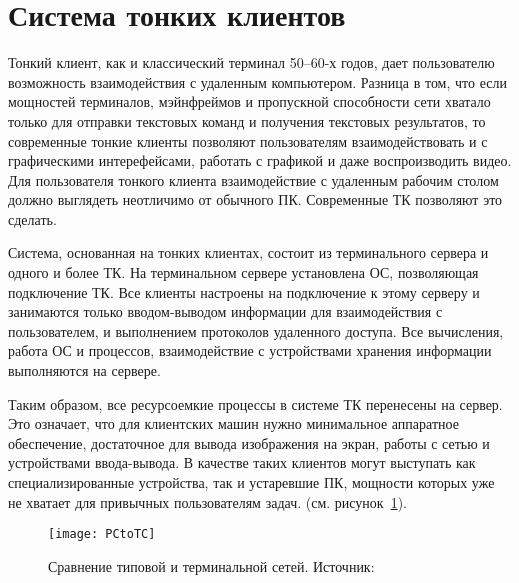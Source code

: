 \section{Система тонких клиентов}
Тонкий клиент, как и классический терминал 50–60-х годов, дает пользователю возможность
взаимодействия с удаленным компьютером. Разница в том, что если мощностей терминалов,
мэйнфреймов и пропускной способности сети хватало только для отправки текстовых команд и
получения текстовых результатов, то современные тонкие клиенты позволяют пользователям
взаимодействовать и с графическими интерефейсами, работать с графикой и даже
воспроизводить видео. Для пользователя тонкого клиента взаимодействие с удаленным
рабочим столом должно выглядеть неотличимо от обычного ПК. Современные ТК позволяют это
сделать.

Система, основанная на тонких клиентах, состоит из терминального сервера и одного и
более ТК. На терминальном сервере установлена ОС, позволяющая подключение ТК. Все
клиенты настроены на подключение к этому серверу и занимаются только вводом-выводом
информации для взаимодействия с пользователем, и выполнением протоколов удаленного
доступа. Все вычисления, работа ОС и процессов, взаимодействие с устройствами хранения
информации выполняются на сервере. 

Таким образом, все ресурсоемкие процессы в системе ТК перенесены на сервер. Это
означает, что для клиентских машин нужно минимальное аппаратное обеспечение, достаточное
для вывода изображения на экран, работы с сетью и устройствами ввода-вывода. В качестве
таких клиентов могут выступать как специализированные устройства, так и устаревшие ПК,
мощности которых уже не хватает для привычных пользователям задач.
(см. рисунок~\ref{pic:PCtoTC}).

\begin{figure}[htpb]
    \center
    \texttt{[image: PCtoTC]}
    \caption{Сравнение типовой и терминальной сетей. Источник: \cite{PCtoTCsrc}}
    \label{pic:PCtoTC}
\end{figure}

